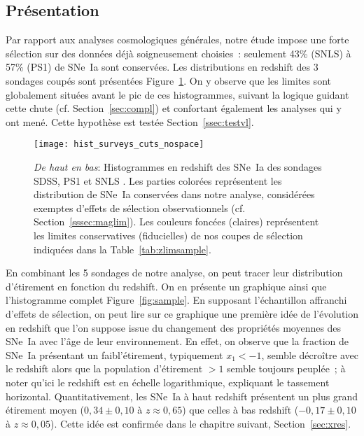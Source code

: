 \documentclass[../main/main.tex]{subfiles}
\begin{document}
\subsection{Présentation}\label{ssec:dataset}

Par rapport aux analyses cosmologiques générales, notre étude impose une forte
sélection sur des données déjà soigneusement choisies~: seulement 43\% (SNLS) à
57\% (PS1) de SNe~Ia sont conservées. Les distributions en redshift des 3
sondages coupés sont présentées Figure~\ref{fig:cuts}. On y observe que les
limites sont globalement situées avant le pic de ces histogrammes, suivant la
logique guidant cette chute (cf. Section~\ref{sec:compl}) et confortant
également les analyses qui y ont mené. Cette hypothèse est testée
Section~\ref{ssec:testvl}.

\begin{figure}
    \centering
    \texttt{[image: hist\_surveys\_cuts\_nospace]}
    \caption[Histogrammes des sondages coupés pour notre étude]{\textit{De haut
        en bas}: Histogrammes en redshift des SNe~Ia des sondages SDSS, PS1 et
        SNLS \citep[données de Pantheon,][]{scolnic2018}. Les parties colorées
        représentent les distribution de SNe~Ia conservées dans notre analyse,
        considérées exemptes d'effets de sélection observationnels (cf.
        Section~\ref{sssec:maglim}). Les couleurs foncées (claires) représentent
        les limites conservatives (fiducielles) de nos coupes de sélection
    indiquées dans la Table~\ref{tab:zlimsample}.}
    \label{fig:cuts}
\end{figure}

En combinant les 5 sondages de notre analyse, on peut tracer leur distribution
d'étirement en fonction du redshift. On en présente un graphique ainsi que
l'histogramme complet Figure~\ref{fig:sample}. En supposant l'échantillon
affranchi d'effets de sélection, on peut lire sur ce graphique une première idée
de l'évolution en redshift que l'on suppose issue du changement des propriétés
moyennes des SNe~Ia avec l'âge de leur environnement. En effet, on observe que
la fraction de SNe~Ia présentant un faibl'étirement, typiquement $x_1 < -1$,
semble décroître avec le redshift alors que la population d'étirement $> 1$
semble toujours peuplée~; à noter qu'ici le redshift est en échelle
logarithmique, expliquant le tassement horizontal. Quantitativement, les SNe~Ia
à haut redshift présentent un plus grand étirement moyen ($0,34 \pm 0,10$ à
$z \approx 0,65$) que celles à bas redshift ($-0,17 \pm 0,10$ à $z \approx
0,05$). Cette idée est confirmée dans le chapitre suivant,
Section~\ref{sec:xres}.
\end{document}
